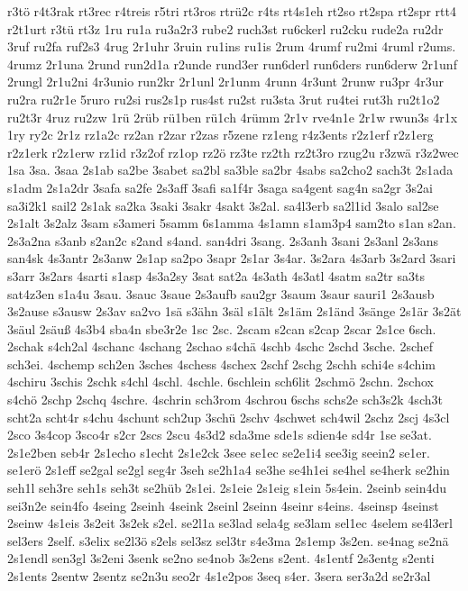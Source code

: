 {r3tö
r4t3rak
rt3rec
r4treis
r5tri
rt3ros
rtrü2c
r4ts
rt4s1eh
rt2so
rt2spa
rt2spr
rtt4
r2t1urt
r3tü
rt3z
1ru
ru1a
ru3a2r3
rube2
ruch3st
ru6ckerl
ru2cku
rude2a
ru2dr
3ruf
ru2fa
ruf2s3
4rug
2r1uhr
3ruin
ru1ins
ru1is
2rum
4rumf
ru2mi
4ruml
r2ums.
4rumz
2r1una
2rund
run2d1a
r2unde
rund3er
run6derl
run6ders
run6derw
2r1unf
2rungl
2r1u2ni
4r3unio
run2kr
2r1unl
2r1unm
4runn
4r3unt
2runw
ru3pr
4r3ur
ru2ra
ru2r1e
5ruro
ru2si
rus2s1p
rus4st
ru2st
ru3sta
3rut
ru4tei
rut3h
ru2t1o2
ru2t3r
4ruz
ru2zw
1rü
2rüb
rü1ben
rü1ch
4rümm
2r1v
rve4n1e
2r1w
rwun3s
4r1x
1ry
ry2c
2r1z
rz1a2c
rz2an
r2zar
r2zas
r5zene
rz1eng
r4z3ents
r2z1erf
r2z1erg
r2z1erk
r2z1erw
rz1id
r3z2of
rz1op
rz2ö
rz3te
rz2th
rz2t3ro
rzug2u
r3zwä
r3z2wec
1sa
3sa.
3saa
2s1ab
sa2be
3sabet
sa2bl
sa3ble
sa2br
4sabs
sa2cho2
sach3t
2s1ada
s1adm
2s1a2dr
3safa
sa2fe
2s3aff
3safi
sa1f4r
3saga
sa4gent
sag4n
sa2gr
3s2ai
sa3i2k1
sail2
2s1ak
sa2ka
3saki
3sakr
4sakt
3s2al.
sa4l3erb
sa2l1id
3salo
sal2se
2s1alt
3s2alz
3sam
s3ameri
5samm
6s1amma
4s1amn
s1am3p4
sam2to
s1an
s2an.
2s3a2na
s3anb
s2an2c
s2and
s4and.
san4dri
3sang.
2s3anh
3sani
2s3anl
2s3ans
san4sk
4s3antr
2s3anw
2s1ap
sa2po
3sapr
2s1ar
3s4ar.
3s2ara
4s3arb
3s2ard
3sari
s3arr
3s2ars
4sarti
s1asp
4s3a2sy
3sat
sat2a
4s3ath
4s3atl
4satm
sa2tr
sa3ts
sat4z3en
s1a4u
3sau.
3sauc
3saue
2s3aufb
sau2gr
3saum
3saur
sauri1
2s3ausb
3s2ause
s3ausw
2s3av
sa2vo
1sä
s3ähn
3säl
s1ält
2s1äm
2s1änd
3sänge
2s1är
3s2ät
3säul
2säuß
4s3b4
sba4n
sbe3r2e
1sc
2sc.
2scam
s2can
s2cap
2scar
2s1ce
6sch.
2schak
s4ch2al
4schanc
4schang
2schao
s4chä
4schb
4schc
2schd
3sche.
2schef
sch3ei.
4schemp
sch2en
3sches
4schess
4schex
2schf
2schg
2schh
schi4e
s4chim
4schiru
3schis
2schk
s4chl
4schl.
4schle.
6schlein
sch6lit
2schmö
2schn.
2schox
s4chö
2schp
2schq
4schre.
4schrin
sch3rom
4schrou
6schs
schs2e
sch3s2k
4sch3t
scht2a
scht4r
s4chu
4schunt
sch2up
3schü
2schv
4schwet
sch4wil
2schz
2scj
4s3cl
2sco
3s4cop
3sco4r
s2cr
2scs
2scu
4s3d2
sda3me
sde1s
sdien4e
sd4r
1se
se3at.
2s1e2ben
seb4r
2s1echo
s1echt
2s1e2ck
3see
se1ec
se2e1i4
see3ig
seein2
se1er.
se1erö
2s1eff
se2gal
se2gl
seg4r
3seh
se2h1a4
se3he
se4h1ei
se4hel
se4herk
se2hin
seh1l
seh3re
seh1s
seh3t
se2hüb
2s1ei.
2s1eie
2s1eig
s1ein
5s4ein.
2seinb
sein4du
sei3n2e
sein4fo
4seing
2seinh
4seink
2seinl
2seinn
4seinr
s4eins.
4seinsp
4seinst
2seinw
4s1eis
3s2eit
3s2ek
s2el.
se2l1a
se3lad
sela4g
se3lam
sel1ec
4selem
se4l3erl
sel3ers
2self.
s3elix
se2l3ö
s2els
sel3sz
sel3tr
s4e3ma
2s1emp
3s2en.
se4nag
se2nä
2s1endl
sen3gl
3s2eni
3senk
se2no
se4nob
3s2ens
s2ent.
4s1entf
2s3entg
s2enti
2s1ents
2sentw
2sentz
se2n3u
seo2r
4s1e2pos
3seq
s4er.
3sera
ser3a2d
se2r3al
}
